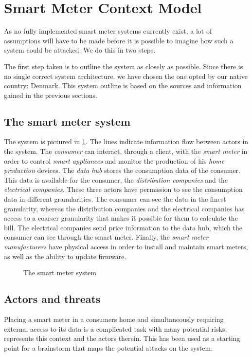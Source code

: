 \section{Smart Meter Context Model}\label{sec:smartmetercontext}
As no fully implemented smart meter systems currently exist, a lot of assumptions will have to be made before it is possible to imagine how such a system could be attacked.
We do this in two steps.

The first step taken is to outline the system as closely as possible.
Since there is no single correct system architecture, we have chosen the one opted by our native country: Denmark.
This system outline is based on the sources and information gained in the previous sections.

\subsection{The smart meter system}
The system is pictured in \cref{contextual:system}.
The lines indicate information flow between actors in the system.
The \emph{consumer} can interact, through a client, with the \emph{smart meter} in order to control \emph{smart appliances} and monitor the production of his \emph{home production} devices.
The \emph{data hub} stores the consumption data of the consumer.
This data is available for the consumer, the \emph{distribution companies} and the \emph{electrical companies}.
These three actors have permission to see the consumption data in different granularities.
The consumer can see the data in the finest granularity, whereas the distribution companies and the electrical companies has access to a coarser granularity that makes it possible for them to calculate the bill.
The electrical companies send price information to the data hub, which the consumer can see through the smart meter.
Finally, the \emph{smart meter manufacturers} have physical access in order to install and maintain smart meters, as well as the ability to update firmware.

\begin{figure}[h]
  \centering
  
  \caption{The smart meter system\cite{tdlm}}
  \label{contextual:system}
\end{figure}

\subsection{Actors and threats}
Placing a smart meter in a consumers home and simultaneously requiring external access to its data is a complicated task with many potential risks.
 represents this context and the actors therein.
This has been used as a starting point for a brainstorm that maps the potential attacks on the system.

